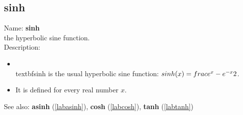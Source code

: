 \subsection{sinh}
\label{labsinh}
\noindent Name: \textbf{sinh}\\
the hyperbolic sine function.\\
\noindent Description: \begin{itemize}

\item \\textbf{sinh} is the usual hyperbolic sine function: $\\sinh(x) = \\frac{e^x - e^{-x}}{2}$.\n
\item It is defined for every real number $x$.\n\end{itemize}
See also: \textbf{asinh} (\ref{labasinh}), \textbf{cosh} (\ref{labcosh}), \textbf{tanh} (\ref{labtanh})
